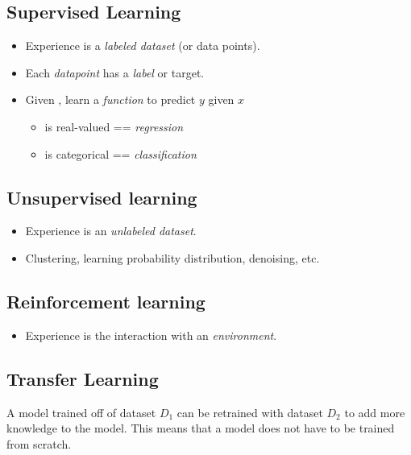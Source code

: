 \documentclass[
	number={1},
	title={Machine Learning Fundamentals}
]{cs584notes}
\begin{document}
\subsection{Supervised Learning}\label{subsec:supervised-learning}
\begin{itemize}
	\item Experience is a \emph{labeled dataset} (or data points).
	\item Each \emph{datapoint} has a \emph{label} or target.
	\item Given , learn a \emph{function}  to predict $y$ given $x$
	\begin{itemize}
		\item {} is real-valued == \emph{regression}
		\item {} is categorical == \emph{classification}
	\end{itemize}
\end{itemize}

\subsection{Unsupervised learning}\label{subsec:unsupervised-learning}
\begin{itemize}
	\item Experience is an \emph{unlabeled dataset}.
	\item Clustering, learning probability distribution, denoising, etc.
\end{itemize}

\subsection{Reinforcement learning}\label{subsec:reinforcement-learning}
\begin{itemize}
	\item Experience is the interaction with an \emph{environment}.
\end{itemize}

\subsection{Transfer Learning}\label{subsec:transfer-learning}
A model trained off of dataset $D_{1}$ can be retrained with dataset $D_{2}$ to add more knowledge to the model.
This means that a model does not have to be trained from scratch.
\end{document}
